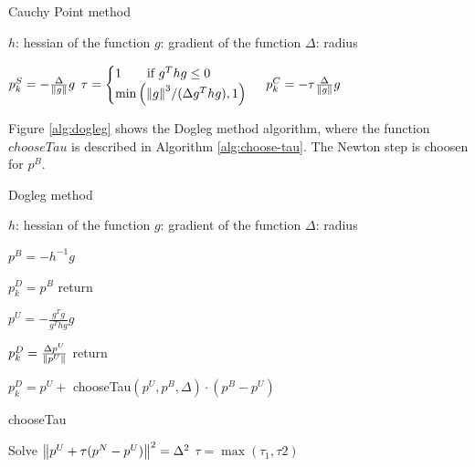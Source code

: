 \documentclass[unicode,11pt,a4paper,oneside,numbers=endperiod,openany]{scrartcl}
\begin{document}
\begin{algorithm}
\caption{Cauchy Point method}\label{alg:cauchy-point}
  \begin{algorithmic}[1]
    \State $h$: hessian of the function
    \State $g$: gradient of the function
    \State $\Delta$: radius

    \State $p_k^S = - \frac{\Delta}{\norm{g}} g$
    \State $\tau = \begin{cases} 1 \qquad \text{if } g^T h g \leq 0 \\ \min \left( \norm{g}^3 / (\Delta g^T h g), 1 \right) \end{cases}$
    \State $p_k^C = - \tau \frac{\Delta}{\norm{g}} g$
  \end{algorithmic}
\end{algorithm}

Figure \ref{alg:dogleg} shows the Dogleg method algorithm, where the function $chooseTau$ is described in Algorithm \ref{alg:choose-tau}.
The Newton step is choosen for $p^B$.

\begin{algorithm}
\caption{Dogleg method}\label{alg:dogleg}
  \begin{algorithmic}[1]
    \State $h$: hessian of the function
    \State $g$: gradient of the function
    \State $\Delta$: radius

    \State $p^B = - h^{-1} g$

        \State $p_k^D = p^B$
        \State return
    \EndIf

    \State $p^U = - \frac{g^T g}{g^T h g} g$

        \State $p_k^D = \frac{\Delta p^U}{\norm{p^U}}$
        \State return
    \EndIf

    \State $p_k^D = p^U + $ chooseTau$(p^U, p^B, \Delta) \cdot (p^B - p^U)$
  \end{algorithmic}
\end{algorithm}


\begin{algorithm}
\caption{chooseTau}\label{alg:choose-tau}
  \begin{algorithmic}[1]
    \State Solve $\norm{p^U + \tau (p^N - p^U)}^2 = \Delta^2$
    \State $\tau = \max (\tau_1, \tau2)$
  \end{algorithmic}
\end{algorithm}

\clearpage
\end{document}
